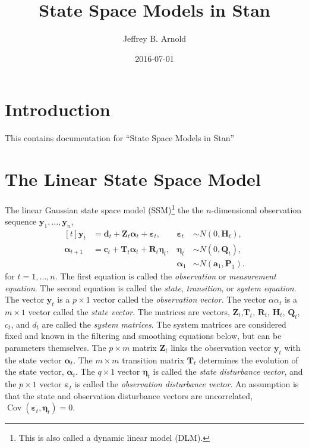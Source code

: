 \documentclass[]{book}
\title{State Space Models in Stan}
\author{Jeffrey B. Arnold}
\date{2016-07-01}
\let\rmarkdownfootnote\footnote%
\def\footnote{\protect\rmarkdownfootnote}
\DeclareMathOperator{\Cov}{Cov}
\newcommand{\mat}[1]{\boldsymbol{#1}}
\renewcommand{\vec}[1]{\boldsymbol{#1}}
\begin{document}
\maketitle

{
\hypersetup{linkcolor=black}
\setcounter{tocdepth}{1}
\tableofcontents
}
\chapter{Introduction}\label{introduction}

This contains documentation for ``State Space Models in Stan''

\chapter{The Linear State Space
Model}\label{the-linear-state-space-model}

\autocite[Sec 3.1]{DurbinKoopman2012}

The linear Gaussian state space model (SSM)\footnote{This is also called
  a dynamic linear model (DLM).} the the \(n\)-dimensional observation
sequence \(\vec{y}_1, \dots, \vec{y}_n\), \[
\begin{aligned}[t]
\vec{y}_t &= \vec{d}_t + \mat{Z}_t \vec{\alpha}_t + \vec{\varepsilon}_t,  &
\vec{\varepsilon}_t & \sim N(0, \mat{H}_t), \\
\vec{\alpha}_{t + 1} &= \vec{c}_t + \mat{T}_t \vec{\alpha}_t + \mat{R}_t \vec{\eta}_t,  &
\vec{\eta}_t & \sim N(0, \mat{Q}_t), \\
&& \vec{\alpha}_1 &\sim N(\vec{a}_1, \mat{P}_1) .
\end{aligned}
\] for \(t = 1, \dots, n\). The first equation is called the
\emph{observation} or \emph{measurement equation}. The second equation
is called the \emph{state}, \emph{transition}, or \emph{system
equation}. The vector \(\vec{y}_t\) is a \(p \times 1\) vector called
the \emph{observation vector}. The vector \(\alpha{\alpha}_t\) is a
\(m \times 1\) vector called the \emph{state vector}. The matrices are
vectors, \(\mat{Z}_t\),\(\mat{T}_t\), \(\mat{R}_t\), \(\mat{H}_t\),
\(\mat{Q}_t\), \(c_t\), and \(d_t\) are called the \emph{system
matrices}. The system matrices are considered fixed and known in the
filtering and smoothing equations below, but can be parameters
themselves. The \(p \times m\) matrix \(\mat{Z}_t\) links the
observation vector \(\vec{y}_t\) with the state vector
\(\vec{\alpha}_t\). The \(m \times m\) transition matrix \(\mat{T}_t\)
determines the evolution of the state vector, \(\vec{\alpha}_t\). The
\(q \times 1\) vector \(\vec{\eta}_t\) is called the \emph{state
disturbance vector}, and the \(p \times 1\) vector
\(\vec{\varepsilon}_t\) is called the \emph{observation disturbance
vector}. An assumption is that the state and observation disturbance
vectors are uncorrelated,
\(\Cov(\vec{\varepsilon}_t, \vec{\eta}_t) = 0\).
\end{document}
